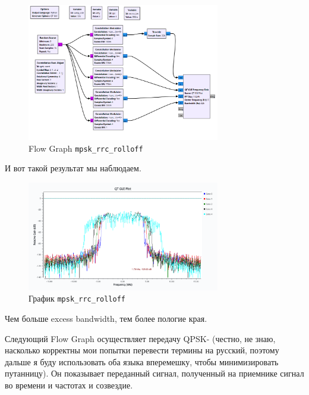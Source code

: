 \documentclass[a4paper,12pt]{report}
\begin{document}
    \begin{figure}[H]
        \centering
        \includegraphics[width=0.75\textwidth]{images/mpsk_rrc_rolloff_fg.png}
        \caption{Flow Graph \texttt{mpsk\_rrc\_rolloff}}
        \label{fig:mpsk_rrc_rolloff_fg}
    \end{figure}
    
    И вот такой результат мы наблюдаем.
    
    \begin{figure}[H]
        \centering
        \includegraphics[width=0.75\textwidth]{images/mpsk_rrc_rolloff_plot.png}
        \caption{График \texttt{mpsk\_rrc\_rolloff}}
        \label{fig:mpsk_rrc_rolloff_plot}
    \end{figure}
    
    Чем больше excess bandwidth, тем более пологие края.
    
    Следующий Flow Graph осуществляет передачу QPSK- (честно, не знаю, насколько корректны мои попытки перевести термины на русский, поэтому дальше я буду использовать оба языка вперемешку, чтобы минимизировать путанницу). Он показывает переданный сигнал, полученный на приемнике сигнал во времени и частотах и созвездие.
    
\end{document}
